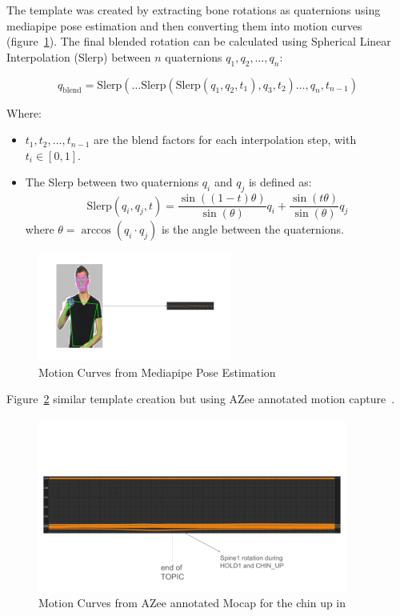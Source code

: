 \documentclass[../../main.tex]{subfiles}
\begin{document}
The template was created by extracting bone rotations as quaternions using mediapipe pose estimation and then converting them into motion curves (figure~\ref{fig:motion_curves_mediapipe}). The final blended rotation can be calculated using Spherical Linear Interpolation (Slerp) between \( n \) quaternions \( q_1, q_2, \dots, q_n \):

\[
q_{\text{blend}} = \text{Slerp}\left(\dots \text{Slerp}\left(\text{Slerp}(q_1, q_2, t_1), q_3, t_2 \right) \dots , q_n, t_{n-1} \right)
\]

Where:
\begin{itemize}
    \item \( t_1, t_2, \dots, t_{n-1} \) are the blend factors for each interpolation step, with \( t_i \in [0, 1] \).
    \item The Slerp between two quaternions \( q_i \) and \( q_j \) is defined as:
    \[
    \text{Slerp}(q_i, q_j, t) = \frac{\sin((1-t)\theta)}{\sin(\theta)} q_i + \frac{\sin(t\theta)}{\sin(\theta)} q_j
    \]
    where \( \theta = \arccos(q_i \cdot q_j) \) is the angle between the quaternions.
\end{itemize}

\begin{figure}
    \centering \includegraphics[width = 2.5in]{chapters/intermediate_blocks/images/motion_curves_mediapipe.png}
    \caption{Motion Curves from Mediapipe Pose Estimation}
    \label{fig:motion_curves_mediapipe}
\end{figure}

Figure~\ref{fig:motion_curves_mocap} similar template creation but using AZee annotated motion capture~\cite{bertin2022rosetta}.

\begin{figure}
    \centering \includegraphics[width = 4in]{chapters/intermediate_blocks/images/motion_curves_mocap.png}
    \caption{Motion Curves from AZee annotated Mocap for the chin up in }
    \label{fig:motion_curves_mocap}
\end{figure}
\end{document}
